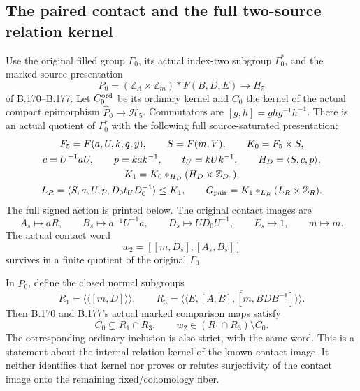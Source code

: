 \subsection*{The paired contact and the full two-source relation kernel}
\label{stmt:B178}
Use the original filled group \(\Gamma _0\), its actual index-two
subgroup \(\Gamma _0^*\), and the marked source presentation
\[
 P_0=(\mathbb Z_A\times\mathbb Z_m)*F(B,D,E)
       \longrightarrow H_5
\]
of B.170--B.177. Let \(C_0^{\rm ord}\) be its ordinary kernel and
\(C_0\) the kernel of the actual compact epimorphism
\(\widehat P_0\to\mathcal H_5\). Commutators are
\([g,h]=ghg^{-1}h^{-1}\). There is an actual quotient of
\(\Gamma _0^*\) with the following full source-saturated presentation:
\begin{equation}\label{eq:B178-target}
\begin{gathered}
 F_5=F(a,U,k,q,y),\qquad S=F(m,V),\qquad K_0=F_5\rtimes S,\\
 c=U^{-1}aU,\qquad p=kak^{-1},\qquad t_U=kUk^{-1},
 \qquad H_D=\langle S,c,p\rangle,\\
 K_1=K_0*_{H_D}(H_D\times\mathbb Z_{D_0}),\\
 L_R=\langle S,a,U,p,D_0t_UD_0^{-1}\rangle\le K_1,\qquad
 G_{\rm pair}=K_1*_{L_R}(L_R\times\mathbb Z_R).
\end{gathered}
\end{equation}
The full signed action is printed below. The original contact images are
\begin{equation}\label{eq:B178-contacts}
 A_s\mapsto aR,\qquad B_s\mapsto a^{-1}U^{-1}a,\qquad
 D_s\mapsto UD_0U^{-1},\qquad E_s\mapsto1,
 \qquad m\mapsto m.
\end{equation}
The actual contact word
\[
                        w_2=[[m,D_s],[A_s,B_s]]
\]
survives in a finite quotient of the original \(\Gamma _0\).

In \(\widehat P_0\), define the closed normal subgroups
\[
 R_1=\overline{\langle\!\langle[m,D]\rangle\!\rangle},\qquad
 R_3=\overline{\langle\!\langle E,[A,B],[m,BDB^{-1}]
                                      \rangle\!\rangle}.
\]
Then B.170 and B.177's actual marked comparison maps satisfy
\begin{equation}\label{eq:B178-strict}
                 C_0\subsetneq R_1\cap R_3,
                 \qquad w_2\in(R_1\cap R_3)\setminus C_0.
\end{equation}
The corresponding ordinary inclusion is also strict, with the same word.
This is a statement about the internal relation kernel of the known
contact image. It neither identifies that kernel nor proves or refutes
surjectivity of the contact image onto the remaining fixed/cohomology fiber.

